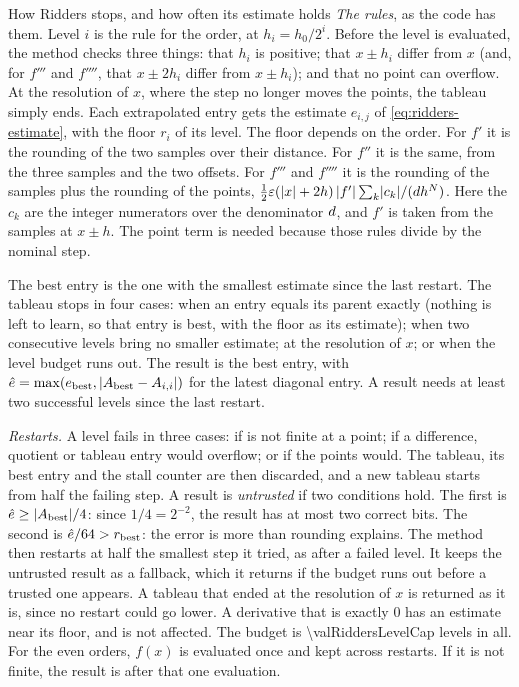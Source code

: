 \begin{sidebar}[label=sb:floor-coverage]{How Ridders stops, and how often its estimate holds}
\emph{The rules}, as the code has them. Level $i$ is the  rule for the order, at
$h_i = h_0 / 2^i$. Before the level is evaluated, the method checks three things: that $h_i$ is positive; that
$x \pm h_i$ differ from $x$ (and, for $f'''$ and $f''''$, that $x \pm 2 h_i$ differ from $x \pm h_i$); and that no
point can overflow. At the resolution of $x$, where the step no longer moves the points, the tableau simply ends.
Each extrapolated entry gets the estimate $e_{i,j}$ of \cref{eq:ridders-estimate}, with the floor $r_i$ of its level.
The floor depends on the order. For $f'$ it is the rounding of the two samples over their distance. For $f''$ it is
the same, from the three samples and the two offsets. For $f'''$ and $f''''$ it is the rounding of the samples plus
the rounding of the points, $\tfrac12 \varepsilon (\lvert x \rvert + 2h)\, \lvert f' \rvert \sum_k \lvert c_k \rvert / (d h^{N})$. Here
the $c_k$ are the integer numerators over the denominator $d$, and $f'$ is taken from the samples at $x \pm h$.
The point term is needed because those rules divide by the nominal step.

The best entry is the one with the smallest estimate since the last restart. The tableau stops in four cases: when an
entry equals its parent exactly (nothing is left to learn, so that entry is best, with the floor as its estimate);
when two consecutive levels bring no smaller estimate; at the resolution of $x$; or when the level budget runs out.
The result is the best entry, with $\hat{e} = \max(e_{\mathrm{best}}, \lvert A_{\mathrm{best}} - A_{i,i} \rvert)$ for the
latest diagonal entry. A result needs at least two successful levels since the last restart.

\emph{Restarts.} A level fails in three cases: if  is not finite at a point; if a difference, quotient or
tableau entry would overflow; or if the points would. The tableau, its best entry and the stall counter are then
discarded, and a new tableau starts from half the failing step. A result is \emph{untrusted} if two conditions hold.
The first is $\hat{e} \ge \lvert A_{\mathrm{best}} \rvert / 4$: since $1/4 = 2^{-2}$, the result has at most two correct
bits. The second is $\hat{e} / 64 > r_{\mathrm{best}}$: the error is more than rounding explains. The method then
restarts at half the smallest step it tried, as after a failed level. It keeps the untrusted result as a fallback,
which it returns if the budget runs out before a trusted one appears. A tableau that ended at the resolution of $x$
is returned as it is, since no restart could go lower. A derivative that is exactly 0 has an estimate near its floor,
and is not affected. The budget is \num{\valRiddersLevelCap} levels in all. For the even orders, $f(x)$ is evaluated
once and kept across restarts. If it is not finite, the result is  after that one evaluation.


\end{sidebar}
